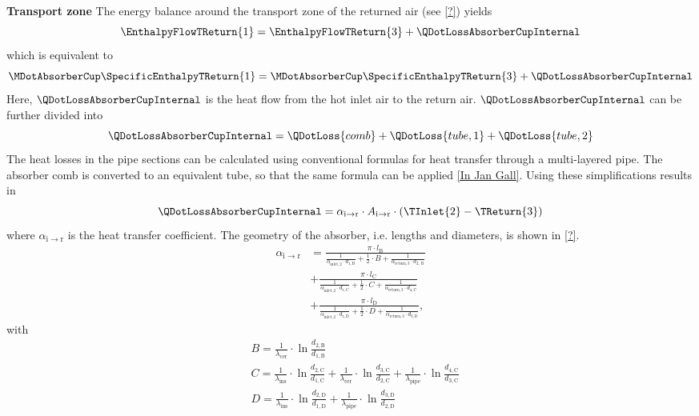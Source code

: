 \textbf{Transport zone}
The energy balance around the transport zone of the returned air (see \cref{?}) yields
\begin{equation}
\EnthalpyFlowTReturn{1} = \EnthalpyFlowTReturn{3} +\QDotLossAbsorberCupInternal
\end{equation}
which is equivalent to
\begin{equation}
\MDotAbsorberCup\SpecificEnthalpyTReturn{1} = \MDotAbsorberCup\SpecificEnthalpyTReturn{3}+\QDotLossAbsorberCupInternal
    \label{eq:SpecificEnthalpyTReturn1}
\end{equation}
Here, \(\QDotLossAbsorberCupInternal\) is the heat flow from the hot inlet air to the return air.
\(\QDotLossAbsorberCupInternal\) can be further divided into
\begin{equation}
    \QDotLossAbsorberCupInternal = \QDotLoss{comb} + \QDotLoss{tube,1} + \QDotLoss{tube,2}
\end{equation}
The heat losses in the pipe sections can be calculated using conventional formulas for heat transfer through a multi-layered pipe.
The absorber comb is converted to an equivalent tube, so that the same formula can be applied \cref{In Jan Gall}.
Using these simplifications results in
\begin{equation}
\QDotLossAbsorberCupInternal= \alpha_{\mathrm{i\to r}} \cdot A_{\mathrm{i\to r}} \cdot (\TInlet{2} - \TReturn{3})
    \label{eq:QDotLossAbsorberCupInternal}
\end{equation}
where \(\alpha_{\mathrm{i\to r}}\) is the heat
transfer coefficient. The geometry of the absorber, i.e. lengths and diameters, is shown in \cref{?}.
\begin{align}
\alpha_{\mathrm{i\to r}} & =\frac{\pi \cdot l_{\mathrm{B}}}{\frac{1}{\alpha_{\mathrm{inlet, 2}} \cdot d_{1, \mathrm{B}}}+\frac{1}{2} \cdot B+\frac{1}{\alpha_{\mathrm{return, 3}} \cdot d_{2, \mathrm{~B}}}} \\
& +\frac{\pi \cdot l_{\mathrm{C}}}{\frac{1}{\alpha_{\mathrm{inlet, 2}} \cdot d_{1, \mathrm{C}}}
        +\frac{1}{2} \cdot C+\frac{1}{\alpha_{\mathrm{return, 3}} \cdot d_{4, \mathrm{C}}}}
    \\
& +\frac{\pi \cdot l_{\mathrm{D}}}{\frac{1}{\alpha_{\mathrm{inlet, 2}} \cdot d_{1, \mathrm{D}}}+\frac{1}{2} \cdot D+\frac{1}{\alpha_{\mathrm{return, 3}} \cdot d_{3, \mathrm{D}}}},
    \label{eq:NTU}
\end{align}
with
\begin{align}
     & B=\frac{1}{\lambda_{\text {cer}}} \cdot \ln \frac{d_{2, \mathrm{B}}}{d_{1, \mathrm{B}}}                                                                                                                                                                              \\
     & C=\frac{1}{\lambda_{\text {ins}}} \cdot \ln \frac{d_{2, \mathrm{C}}}{d_{1, \mathrm{C}}}+\frac{1}{\lambda_{\text {cer}}} \cdot \ln \frac{d_{3, \mathrm{C}}}{d_{2, \mathrm{C}}}+\frac{1}{\lambda_{\text {pipe}}} \cdot \ln \frac{d_{4, \mathrm{C}}}{d_{3, \mathrm{C}}} \\
     & D=\frac{1}{\lambda_{\text {ins}}} \cdot \ln \frac{d_{2, \mathrm{D}}}{d_{1, \mathrm{D}}}+\frac{1}{\lambda_{\text {pipe}}} \cdot \ln \frac{d_{3, \mathrm{D}}}{d_{2, \mathrm{D}}}
    \label{eq:NTUConstants}
\end{align}
